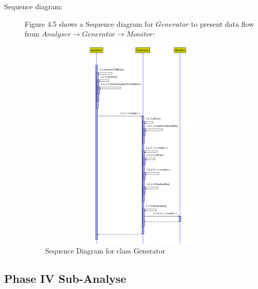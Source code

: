 \begin{description}
\item[Sequence diagram: ] 

Figure 4.5 shows a Sequence diagram for $Generator$ to present data flow from $Analyser \rightarrow Generator \rightarrow Monitor$:

\begin{figure}[h]
    \centering
    \includegraphics[width=4.5in, height=4in]{figures/sequence_generator}
    \caption[Sequence Diagram for class Generator]{Sequence Diagram for class Generator}
    \label{fig:figure4_42}
\end{figure}

\end{description}

\subsection{Phase IV Sub-Analyse}

